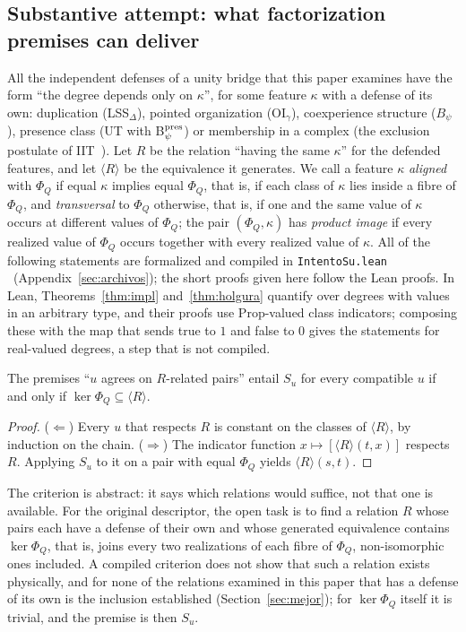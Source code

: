\subsection{Substantive attempt: what factorization premises can deliver}\label{sec:intento}
All the independent defenses of a unity bridge that this paper examines have the form ``the degree depends only on $\kappa$'', for some feature $\kappa$ with a defense of its own: duplication (LSS$_\Delta$), pointed organization (OI$_\gamma$), coexperience structure ($B_\psi$), presence class (UT with B$_\psi^{\rm pres}$) or membership in a complex (the exclusion postulate of IIT~\cite{Oizumi2014}). Let $R$ be the relation ``having the same $\kappa$'' for the defended features, and let $\langle R\rangle$ be the equivalence it generates. We call a feature $\kappa$ \emph{aligned} with $\Phi_Q$ if equal $\kappa$ implies equal $\Phi_Q$, that is, if each class of $\kappa$ lies inside a fibre of $\Phi_Q$, and \emph{transversal} to $\Phi_Q$ otherwise, that is, if one and the same value of $\kappa$ occurs at different values of $\Phi_Q$; the pair $(\Phi_Q,\kappa)$ has \emph{product image} if every realized value of $\Phi_Q$ occurs together with every realized value of $\kappa$. All of the following statements are formalized and compiled in \texttt{IntentoSu.lean} \stL\ (Appendix~\ref{sec:archivos}); the short proofs given here follow the Lean proofs. In Lean, Theorems~\ref{thm:impl} and~\ref{thm:holgura} quantify over degrees with values in an arbitrary type, and their proofs use $\mathrm{Prop}$-valued class indicators; composing these with the map that sends true to $1$ and false to $0$ gives the statements for real-valued degrees, a step that is not compiled.

\begin{theorem}\label{thm:impl}
The premises ``$u$ agrees on $R$-related pairs'' entail $S_u$ for every compatible $u$ if and only if $\ker\Phi_Q\subseteq\langle R\rangle$.
\end{theorem}
\begin{proof}
($\Leftarrow$) Every $u$ that respects $R$ is constant on the classes of $\langle R\rangle$, by induction on the chain. ($\Rightarrow$) The indicator function $x\mapsto[\langle R\rangle(t,x)]$ respects $R$. Applying $S_u$ to it on a pair with equal $\Phi_Q$ yields $\langle R\rangle(s,t)$.
\end{proof}
The criterion is abstract: it says which relations would suffice, not that one is available. For the original descriptor, the open task is to find a relation $R$ whose pairs each have a defense of their own and whose generated equivalence contains $\ker\Phi_Q$, that is, joins every two realizations of each fibre of $\Phi_Q$, non-isomorphic ones included. A compiled criterion does not show that such a relation exists physically, and for none of the relations examined in this paper that has a defense of its own is the inclusion established (Section~\ref{sec:mejor}); for $\ker\Phi_Q$ itself it is trivial, and the premise is then $S_u$.

